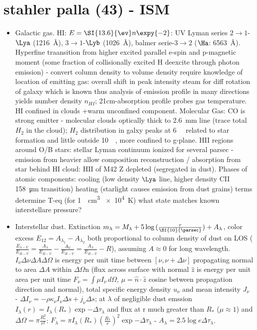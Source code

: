 \chapter{stahler palla (43) - ISM}

\begin{itemize}
\item Galactic gas. HI: $E=\SI{13.6}{\ev}n\expy{-2}$: UV Lyman series $2\to1$-$\Lya$ (\SI{1216}{\angstrom}), $3\to1$-$\Lyb$ (\SI{1026}{\angstrom}), balmer serie-$3\to2$ ($\Ha$: \SI{6563}{\angstrom}). Hyperfine traansition from higher excited parallel e-spin and p-magnetic moment (some fraction of collisionally excited H deexcite through photon emission) - convert column density to volume density require knowledge of location of emitting gas: overall shift in peak intensity steam for diff rotation of galaxy which is known thus analysis of emission profile in many directions yields number density $n_{HI}$; 21cm-absorption profile probes gas temperature. HI confined in clouds +warm unconfined component.
Molecular Gas: CO is strong emitter - molecular clouds optically thick to \SI{2.6}{\milli\meter} line (trace total $H_2$ in the cloud); $H_2$ distribution in galxy peaks at \SI{6}{\kilo\parsec} related to star formation and little outside \SI{10}{\kilo\parsec}, more confined to g-plane.
HII regions around O/B stars: stellar Lyman continuum ionized for several parsec - emission from heavier allow composition reconstruction / absorption from star behind HI cloud: HII of M42 Z depleted (segregated in dust).
Phases of atomic components: cooling (low density $\Lya$ line, higher density CII \SI{158}{\micro\meter} transition) heating (starlight causes \Pelectron emission from dust grains) terms determine T-eq (for \SI{1}{\per\cubic\cm} \SI{e4}{\kelvin}) what state matches known interstellare pressure?
\item Interstellar dust. Extinction $m_{\lambda}=M_{\lambda}+5\log{(\frac{r}{\SI{10}{\parsec}})}+A_{\lambda}$, color excess $E_{12}=A_{\lambda_1}-A_{\lambda_2}$ both proportional to column density of dust on LOS ($\frac{E_{\lambda-V}}{E_{B-V}}=\frac{A_{\lambda}}{E_{B-V}}-\frac{A_V}{E_{B-V}}=\frac{A_{\lambda}}{E_{B-V}}-R$), assuming $A\approx0$ for long wavelength.
$I_{\nu}\Delta\nu\Delta A\Delta\Omega$ is energy per unit time between $[\nu,\nu+\Delta\nu]$ propagating normal to area $\Delta A$ within $\Delta\Omega$n (flux across surface with normal $\hat{z}$ is energy per unit area per unit time $F_{\nu}=\int\mu I_{\nu}\,d\Omega$, $\mu=\hat{n}\cdot\hat{z}$ cosine between propagation direction and normal), total specific energy density $u_{\nu}$ and mean intensity $J_{\nu}$ - $\Delta I_{\nu}=-\rho\kappa_{\nu}I_{\nu}\Delta s+j_{\nu}\Delta s$; at $\lambda$ of negligible dust emssion $I_{\lambda}(r)=I_{\lambda}(R_*)\exp{-\Delta\tau_{\lambda}}$ and flux at r much greater than $R_*$ ($\mu\approx1$) and $\Delta\Omega=\pi\frac{R_*^2}{r^2}$: $F_{\lambda}=\pi I_{\lambda}(R_*)(\frac{R_*}{r})^2\exp{-\Delta\tau_{\lambda}}$ - $A_{\lambda}=2.5\log{e}\Delta\tau_{\lambda}$.

\end{itemize}

